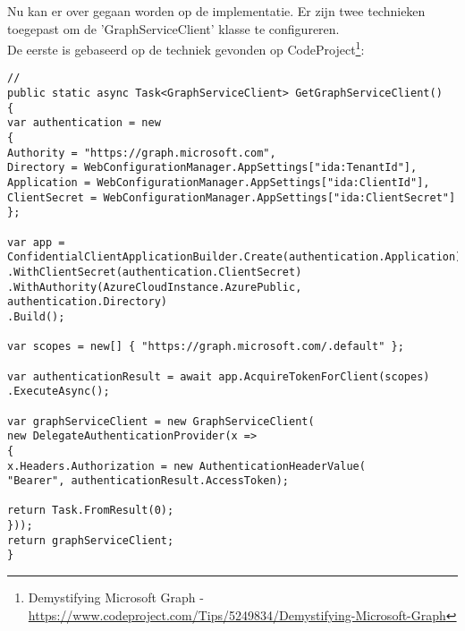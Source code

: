 Nu kan er over gegaan worden op de implementatie. Er zijn twee technieken toegepast om de 'GraphServiceClient' klasse te configureren.\\
De eerste is gebaseerd op de techniek gevonden op CodeProject\footnote{Demystifying Microsoft Graph - \url{https://www.codeproject.com/Tips/5249834/Demystifying-Microsoft-Graph}}:
\begin{lstlisting}[style=CSharpStyle]
//
public static async Task<GraphServiceClient> GetGraphServiceClient()
{
var authentication = new
{
Authority = "https://graph.microsoft.com",
Directory = WebConfigurationManager.AppSettings["ida:TenantId"],
Application = WebConfigurationManager.AppSettings["ida:ClientId"],
ClientSecret = WebConfigurationManager.AppSettings["ida:ClientSecret"]
};

var app = ConfidentialClientApplicationBuilder.Create(authentication.Application)
.WithClientSecret(authentication.ClientSecret)
.WithAuthority(AzureCloudInstance.AzurePublic, authentication.Directory)
.Build();

var scopes = new[] { "https://graph.microsoft.com/.default" };

var authenticationResult = await app.AcquireTokenForClient(scopes)
.ExecuteAsync();

var graphServiceClient = new GraphServiceClient(
new DelegateAuthenticationProvider(x =>
{
x.Headers.Authorization = new AuthenticationHeaderValue(
"Bearer", authenticationResult.AccessToken);

return Task.FromResult(0);
}));
return graphServiceClient;
}
\end{lstlisting}

